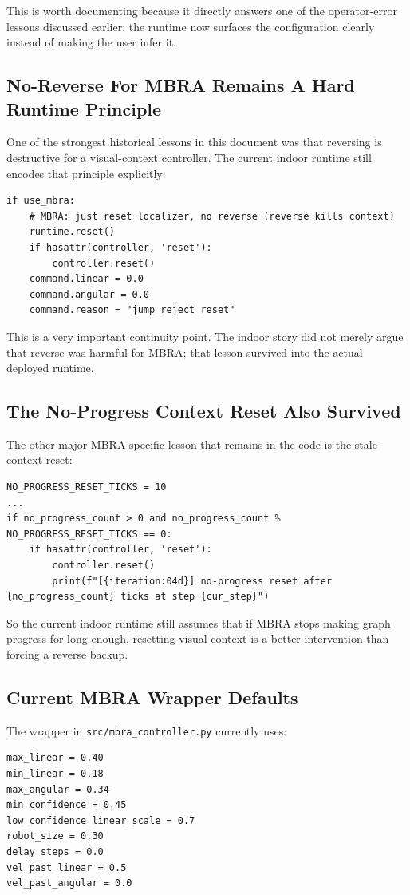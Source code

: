 \documentclass[11pt]{article}
\begin{document}
This is worth documenting because it directly answers one of the operator-error lessons discussed earlier: the runtime now surfaces the configuration clearly instead of making the user infer it.

\subsection{No-Reverse For MBRA Remains A Hard Runtime Principle}
One of the strongest historical lessons in this document was that reversing is destructive for a visual-context controller. The current indoor runtime still encodes that principle explicitly:
\begin{lstlisting}
if use_mbra:
    # MBRA: just reset localizer, no reverse (reverse kills context)
    runtime.reset()
    if hasattr(controller, 'reset'):
        controller.reset()
    command.linear = 0.0
    command.angular = 0.0
    command.reason = "jump_reject_reset"
\end{lstlisting}

This is a very important continuity point. The indoor story did not merely argue that reverse was harmful for MBRA; that lesson survived into the actual deployed runtime.

\subsection{The No-Progress Context Reset Also Survived}
The other major MBRA-specific lesson that remains in the code is the stale-context reset:
\begin{lstlisting}
NO_PROGRESS_RESET_TICKS = 10
...
if no_progress_count > 0 and no_progress_count % NO_PROGRESS_RESET_TICKS == 0:
    if hasattr(controller, 'reset'):
        controller.reset()
        print(f"[{iteration:04d}] no-progress reset after {no_progress_count} ticks at step {cur_step}")
\end{lstlisting}

So the current indoor runtime still assumes that if MBRA stops making graph progress for long enough, resetting visual context is a better intervention than forcing a reverse backup.

\subsection{Current MBRA Wrapper Defaults}
The wrapper in \texttt{src/mbra\_controller.py} currently uses:
\begin{lstlisting}
max_linear = 0.40
min_linear = 0.18
max_angular = 0.34
min_confidence = 0.45
low_confidence_linear_scale = 0.7
robot_size = 0.30
delay_steps = 0.0
vel_past_linear = 0.5
vel_past_angular = 0.0
\end{lstlisting}
\end{document}
